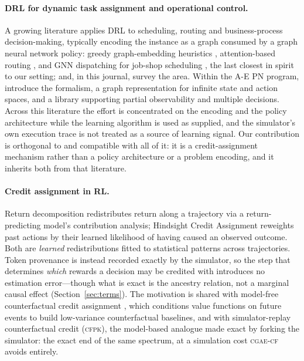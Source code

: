 \documentclass[review,authoryear,3p,times]{elsarticle}
\newcommand{\cflow}{\textsc{cgae-cf}}          %
\newcommand{\cfpk}{\textsc{cfpk}}
\begin{document}
\paragraph{DRL for dynamic task assignment and operational control.} A growing
literature applies DRL to scheduling, routing and business-process
decision-making, typically encoding the instance as a graph consumed by a graph
neural network policy: greedy graph-embedding heuristics
\citep{khalil2017learning}, attention-based routing \citep{nazari2018vrp}, and
GNN dispatching for job-shop scheduling \citep{zhang2020jobshop}, the last
closest in spirit to our setting; \citet{mazyavkina2021survey} and, in this
journal, \citet{bengio2021tour} survey the area. Within the A-E PN program,
\citet{aepn2023} introduce the formalism, \citet{aepn_repr2025} a graph
representation for infinite state and action spaces, and \citet{gympn2025} a
library supporting partial observability and multiple decisions. Across this
literature the effort is concentrated on the encoding and the policy
architecture while the learning algorithm is used as supplied, and the
simulator's own execution trace is not treated as a source of learning signal.
Our contribution is orthogonal to and compatible with all of it: it is a
credit-assignment mechanism rather than a policy architecture or a problem
encoding, and it inherits both from that literature.

\paragraph{Credit assignment in RL.} Return decomposition \citep{rudder2019}
redistributes return along a trajectory via a return-predicting model's
contribution analysis; Hindsight Credit Assignment \citep{hca2019} reweights
past actions by their learned likelihood of having caused an observed outcome.
Both are \emph{learned} redistributions fitted to statistical patterns across
trajectories. Token provenance is instead recorded exactly by the simulator, so
the step that determines \emph{which} rewards a decision may be credited with
introduces no estimation error---though what is exact is the ancestry relation,
not a marginal causal effect (Section~\ref{sec:terms}). The motivation is shared
with model-free counterfactual credit assignment \citep{ccadeep2021}, which
conditions value functions on future events to build low-variance counterfactual
baselines, and with simulator-replay counterfactual credit (\cfpk{}), the
model-based analogue made exact by forking the simulator: the exact end of the
same spectrum, at a simulation cost \cflow{} avoids entirely.
\end{document}
